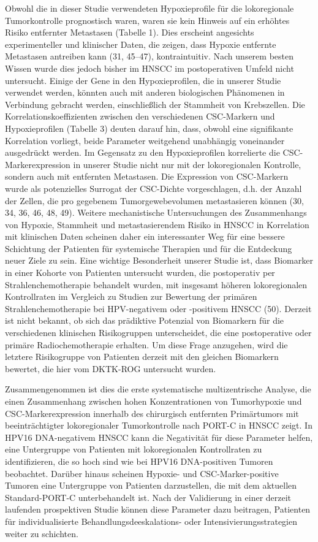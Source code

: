 Obwohl die in dieser Studie verwendeten Hypoxieprofile für die lokoregionale Tumorkontrolle prognostisch waren, waren sie kein Hinweis auf ein erhöhtes Risiko entfernter Metastasen (Tabelle 1). Dies erscheint angesichts experimenteller und klinischer Daten, die zeigen, dass Hypoxie entfernte Metastasen antreiben kann (31, 45--47), kontraintuitiv. Nach unserem besten Wissen wurde dies jedoch bisher im HNSCC im postoperativen Umfeld nicht untersucht. Einige der Gene in den Hypoxieprofilen, die in unserer Studie verwendet werden, könnten auch mit anderen biologischen Phänomenen in Verbindung gebracht werden, einschließlich der Stammheit von Krebszellen. Die Korrelationskoeffizienten zwischen den verschiedenen CSC-Markern und Hypoxieprofilen (Tabelle 3) deuten darauf hin, dass, obwohl eine signifikante Korrelation vorliegt, beide Parameter weitgehend unabhängig voneinander ausgedrückt werden. Im Gegensatz zu den Hypoxieprofilen korrelierte die CSC-Markerexpression in unserer Studie nicht nur mit der lokoregionalen Kontrolle, sondern auch mit entfernten Metastasen. Die Expression von CSC-Markern wurde als potenzielles Surrogat der CSC-Dichte vorgeschlagen, d.h. der Anzahl der Zellen, die pro gegebenem Tumorgewebevolumen metastasieren können (30, 34, 36, 46, 48, 49). Weitere mechanistische Untersuchungen des Zusammenhangs von Hypoxie, Stammheit und metastasierendem Risiko in HNSCC in Korrelation mit klinischen Daten scheinen daher ein interessanter Weg für eine bessere Schichtung der Patienten für systemische Therapien und für die Entdeckung neuer Ziele zu sein. Eine wichtige Besonderheit unserer Studie ist, dass Biomarker in einer Kohorte von Patienten untersucht wurden, die postoperativ per Strahlenchemotherapie behandelt wurden, mit insgesamt höheren lokoregionalen Kontrollraten im Vergleich zu Studien zur Bewertung der primären Strahlenchemotherapie bei HPV-negativem oder -positivem HNSCC (50). Derzeit ist nicht bekannt, ob sich das prädiktive Potenzial von Biomarkern für die verschiedenen klinischen Risikogruppen unterscheidet, die eine postoperative oder primäre Radiochemotherapie erhalten. Um diese Frage anzugehen, wird die letztere Risikogruppe von Patienten derzeit mit den gleichen Biomarkern bewertet, die hier vom DKTK-ROG untersucht wurden.

Zusammengenommen ist dies die erste systematische multizentrische Analyse, die einen Zusammenhang zwischen hohen Konzentrationen von Tumorhypoxie und CSC-Markerexpression innerhalb des chirurgisch entfernten Primärtumors mit beeinträchtigter lokoregionaler Tumorkontrolle nach PORT-C in HNSCC zeigt. In HPV16 DNA-negativem HNSCC kann die Negativität für diese Parameter helfen, eine Untergruppe von Patienten mit lokoregionalen Kontrollraten zu identifizieren, die so hoch sind wie bei HPV16 DNA-positiven Tumoren beobachtet. Darüber hinaus scheinen Hypoxie- und CSC-Marker-positive Tumoren eine Untergruppe von Patienten darzustellen, die mit dem aktuellen Standard-PORT-C unterbehandelt ist. Nach der Validierung in einer derzeit laufenden prospektiven Studie können diese Parameter dazu beitragen, Patienten für individualisierte Behandlungsdeeskalations- oder Intensivierungsstrategien weiter zu schichten.

